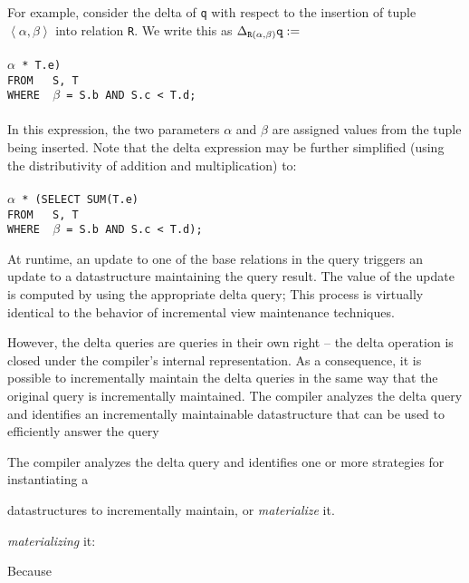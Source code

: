 \begin{example}
For example, consider the delta of {\tt q} with respect to the insertion of tuple $\left< \alpha, \beta\right>$ into relation {\tt R}.  We write this as $\Delta_{{\tt R}(\alpha, \beta)}{\tt q :=}$
\\ \\
$\alpha${\tt\ * T.e)\\
FROM\ \ \ S, T\\
WHERE\ \ }$\beta${\tt\ = S.b AND S.c < T.d;}
\\ \\
In this expression, the two parameters $\alpha$ and $\beta$ are assigned values from the tuple being inserted.  Note that the delta expression may be further simplified (using the distributivity of addition and multiplication) to: 
\\ \\
\noindent $\alpha${\tt\ * (SELECT SUM(T.e)\\
\hspace*{8.8mm}FROM\ \ \ S, T\\
\hspace*{8.8mm}WHERE\ \ }$\beta${\tt\ = S.b AND S.c < T.d);
}
\end{example}

At runtime, an update to one of the base relations in the query triggers an update to a datastructure maintaining the query result.  The value of the update is computed by using the appropriate delta query; This process is virtually identical to the behavior of incremental view maintenance techniques\cite{cite?}.  

However, the delta queries are queries in their own right -- the delta operation is closed under the compiler's internal representation.  As a consequence, it is possible to incrementally maintain the delta queries in the same way that the original query is incrementally maintained.  The compiler analyzes the delta query and identifies an incrementally maintainable datastructure that can be used to efficiently answer the query



The compiler analyzes the delta query and identifies one or more strategies for instantiating a 

 datastructures to incrementally maintain, or {\em materialize} it.


 {\em materializing} it: 

Because 



